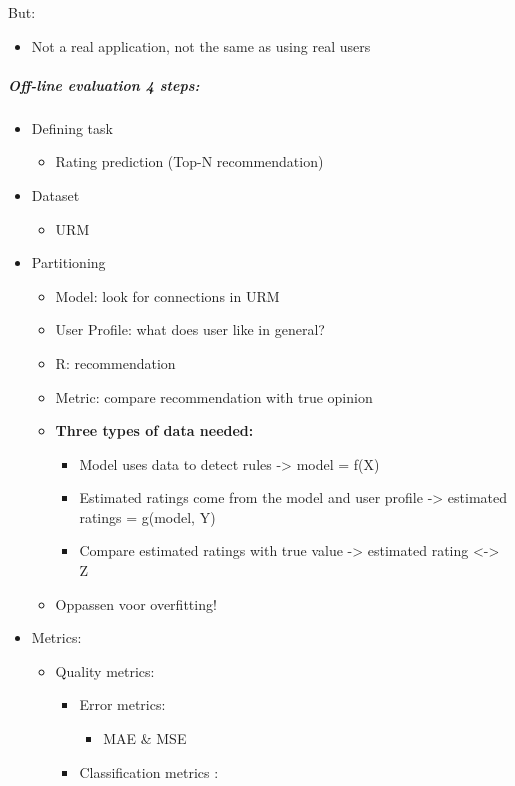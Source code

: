 \documentclass[12pt]{article}
\begin{document}
But:\begin{itemize}
    \item Not a real application, not the same as using real users
\end{itemize}
\subparagraph{Off-line evaluation 4 steps:}
\begin{itemize}
    \item Defining task\begin{itemize}
        \item Rating prediction (Top-N recommendation)
    \end{itemize}
    \item Dataset\begin{itemize}
        \item URM
    \end{itemize}
    \item Partitioning \begin{itemize}
        \item Model: look for connections in URM
        \item User Profile: what does user like in general?
        \item R: recommendation
        \item Metric: compare recommendation with true opinion
        \item \textbf{Three types of data needed:}\begin{itemize}
            \item Model uses data to detect rules -> model = f(X)
            \item Estimated ratings come from the model and user profile -> estimated ratings = g(model, Y)
            \item Compare estimated ratings with true value -> estimated rating <-> Z
        \end{itemize}
        \item Oppassen voor overfitting!
    \end{itemize}
    \item Metrics:\begin{itemize}
        \item Quality metrics:\begin{itemize}
            \item Error metrics:\begin{itemize}
                \item MAE \& MSE
            \end{itemize}
            \item Classification metrics :\begin{itemize}

\end{itemize}
\end{itemize}
\end{itemize}
\end{itemize}
\end{document}
